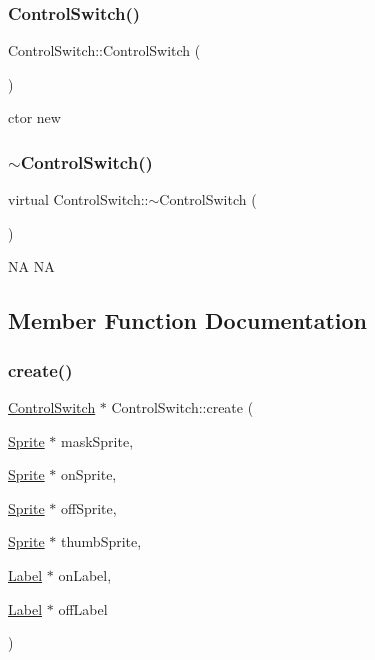 \subsubsection{\texorpdfstring{Control\+Switch()}{ControlSwitch()}\hspace{0.1cm}{\footnotesize\ttfamily [2/2]}}
{\footnotesize\ttfamily Control\+Switch\+::\+Control\+Switch (\begin{DoxyParamCaption}{ }\end{DoxyParamCaption})}

ctor  new \mbox{\label{classControlSwitch_a3611bc626673e46fae1f30c398376aad}} 
\subsubsection{\texorpdfstring{$\sim$\+Control\+Switch()}{~ControlSwitch()}\hspace{0.1cm}{\footnotesize\ttfamily [2/2]}}
{\footnotesize\ttfamily virtual Control\+Switch\+::$\sim$\+Control\+Switch (\begin{DoxyParamCaption}{ }\end{DoxyParamCaption})\hspace{0.3cm}{\ttfamily [virtual]}}

NA  NA 

\subsection{Member Function Documentation}
\mbox{\label{classControlSwitch_abe03717adad19f4aa909e86f8f5a3122}} 
\subsubsection{\texorpdfstring{create()}{create()}\hspace{0.1cm}{\footnotesize\ttfamily [1/4]}}
{\footnotesize\ttfamily \hyperlink{classControlSwitch}{Control\+Switch} $\ast$ Control\+Switch\+::create (\begin{DoxyParamCaption}\item[{\hyperlink{classSprite}{Sprite} $\ast$}]{mask\+Sprite,  }\item[{\hyperlink{classSprite}{Sprite} $\ast$}]{on\+Sprite,  }\item[{\hyperlink{classSprite}{Sprite} $\ast$}]{off\+Sprite,  }\item[{\hyperlink{classSprite}{Sprite} $\ast$}]{thumb\+Sprite,  }\item[{\hyperlink{classLabel}{Label} $\ast$}]{on\+Label,  }\item[{\hyperlink{classLabel}{Label} $\ast$}]{off\+Label }\end{DoxyParamCaption})\hspace{0.3cm}{\ttfamily [static]}}

